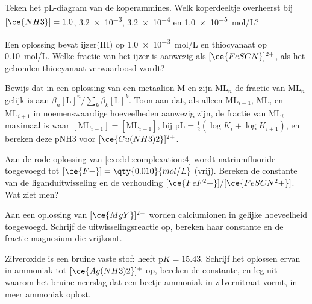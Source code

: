 \begin{exercise}[$\star$]\label{exo:b1:complexation:3}
Teken het pL-diagram van de koperammines. Welk koperdeeltje overheerst
bij $[\ce{NH3}] = 1.0$, \num{3.2e-3}, \num{3.2e-4} en
\qty{1.0e-5}{mol/L}?
\end{exercise}

\begin{exercise}[$\star$]\label{exo:b1:complexation:4}
Een oplossing bevat ijzer(III) op \qty{1.0e-3}{mol/L} en thiocyanaat op
\qty{0.10}{mol/L}. Welke fractie van het ijzer is aanwezig als
$[\ce{FeSCN}]^{2+}$, als het gebonden thiocyanaat verwaarloosd wordt?
\end{exercise}

\begin{exercise}[$\star\star$]\label{exo:b1:complexation:5}
Bewijs dat in een oplossing van een metaalion M en zijn 
$\mathrm{ML}_n$ de fractie van $\mathrm{ML}_n$ gelijk is aan
$\beta_n[\mathrm{L}]^n / \sum_{k} \beta_k[\mathrm{L}]^k$. Toon aan dat,
als alleen $\mathrm{ML}_{i-1}$, $\mathrm{ML}_i$ en $\mathrm{ML}_{i+1}$ in
noemenswaardige hoeveelheden aanwezig zijn, de fractie van
$\mathrm{ML}_i$ maximaal is waar $[\mathrm{ML}_{i-1}] = [\mathrm{ML}_{i+1}]$,
bij $\mathrm{pL} = \frac12(\log K_i + \log K_{i+1})$, en bereken deze
pNH3 voor $[\ce{Cu(NH3)2}]^{2+}$.
\end{exercise}

\begin{exercise}[$\star\star$]\label{exo:b1:complexation:6}
Aan de rode oplossing van \cref{exo:b1:complexation:4} wordt
natriumfluoride toegevoegd tot $[\ce{F-}] = \qty{0.010}{mol/L}$ (vrij).
Bereken de constante van de liganduitwisseling en de verhouding
$[\ce{FeF^2+}]/[\ce{FeSCN^2+}]$. Wat ziet men?
\end{exercise}

\begin{exercise}[$\star\star$]\label{exo:b1:complexation:7}
Aan een oplossing van $[\ce{MgY}]^{2-}$ worden calciumionen in gelijke
hoeveelheid toegevoegd. Schrijf de uitwisselingsreactie op, bereken haar
constante en de fractie magnesium die vrijkomt.
\end{exercise}

\begin{exercise}[$\star\star$]\label{exo:b1:complexation:8}
Zilveroxide  is een bruine vaste stof: 
heeft $\mathrm{p}K = 15.43$. Schrijf het oplossen ervan in ammoniak tot
$[\ce{Ag(NH3)2}]^{+}$ op, bereken de constante, en leg uit waarom het
bruine neerslag dat een beetje ammoniak in zilvernitraat vormt, in meer
ammoniak oplost.
\end{exercise}

